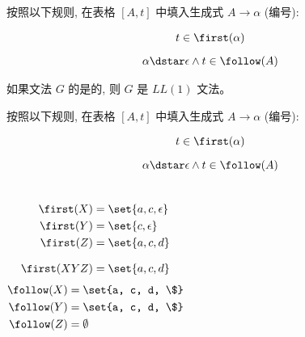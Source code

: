 \begin{frame}{}
  \begin{center}

    \vspace{0.80cm}
    按照以下规则, 在表格 $[A, t]$ 中填入生成式 $A \to \alpha$ (编号):

    \begin{gather}
      t \in \first(\alpha) \\[6pt]
      \alpha \dstar \epsilon \land t \in \follow(A)
    \end{gather}

    \pause
    \begin{definition}[$LL(1)$文法]
      如果文法 $G$ 的是的,
      则 $G$ 是 $LL(1)$ 文法。
    \end{definition}
  \end{center}
\end{frame}

\begin{frame}{}
  \begin{center}
    按照以下规则, 在表格 $[A, t]$ 中填入生成式 $A \to \alpha$ (编号):

    \setcounter{equation}{0}
    \begin{gather}
      t \in \first(\alpha) \\[6pt]
      \alpha \dstar \epsilon \land t \in \follow(A)
    \end{gather}

    \vspace{0.60cm}
  \end{center}
\end{frame}

\begin{frame}{}
  \begin{columns}
      
      \begin{align*}
        \first(X) &= \set{a, c, \epsilon} \\
        \first(Y) &= \set{c, \epsilon} \\
        \first(Z) &= \set{a, c, d} \\[8pt]
        \first(XYZ) &= \set{a, c, d}
      \end{align*}
      \begin{align*}
        \follow(X) &= \set{a, c, d, \$} \\
        \follow(Y) &= \set{a, c, d, \$} \\
        \follow(Z) &= \emptyset
      \end{align*}
  \end{columns}

  
\end{frame}

